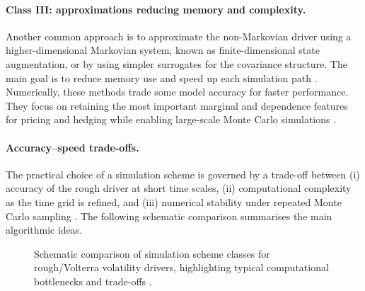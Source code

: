 \documentclass[12pt,a4paper]{article}
\theoremstyle{definition}
\theoremstyle{plain}
\theoremstyle{remark}
\theoremstyle{plain}
\begin{document}
\paragraph{Class III: approximations reducing memory and complexity.}
Another common approach is to approximate the non-Markovian driver using a higher-dimensional Markovian system, known as finite-dimensional state augmentation, or by using simpler surrogates for the covariance structure. The main goal is to reduce memory use and speed up each simulation path \cite{BayerFriz2016}. Numerically, these methods trade some model accuracy for faster performance. They focus on retaining the most important marginal and dependence features for pricing and hedging while enabling large-scale Monte Carlo simulations \cite{BayerFriz2016}.

\paragraph{Accuracy--speed trade-offs.}
The practical choice of a simulation scheme is governed by a trade-off between (i) accuracy of the rough driver at short time scales, (ii) computational complexity as the time grid is refined, and (iii) numerical stability under repeated Monte Carlo sampling \cite{BayerFriz2016}. The following schematic comparison summarises the main algorithmic ideas.

\begin{figure}[H]
\centering
{}
\caption{Schematic comparison of simulation scheme classes for rough/Volterra volatility drivers, highlighting typical computational bottlenecks and trade-offs \cite{BayerFriz2016}.}
\label{fig:scheme_comparison_table}
\end{figure}
\FloatBarrier
\end{document}
